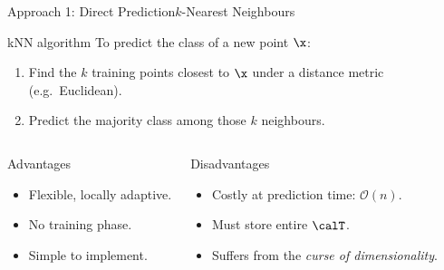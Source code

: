 \begin{frame}{Approach 1: Direct Prediction}{$k$-Nearest Neighbours}
  \begin{exampleblock}{kNN algorithm}
    To predict the class of a new point $\x$:
    \begin{enumerate}
      \item Find the $k$ training points closest to $\x$ under a distance metric
            (e.g.\ Euclidean).
      \item Predict the majority class among those $k$ neighbours.
    \end{enumerate}
  \end{exampleblock}
  \bigskip
  \begin{columns}[T]
    \begin{block}{Advantages}
      \begin{itemize}
        \item Flexible, locally adaptive.
        \item No training phase.
        \item Simple to implement.
      \end{itemize}
    \end{block}
    \begin{alertblock}{Disadvantages}
      \begin{itemize}
        \item Costly at prediction time: $\mathcal{O}(n)$.
        \item Must store entire $\calT$.
        \item Suffers from the \emph{curse of dimensionality}.
      \end{itemize}
    \end{alertblock}
  \end{columns}
\end{frame}

